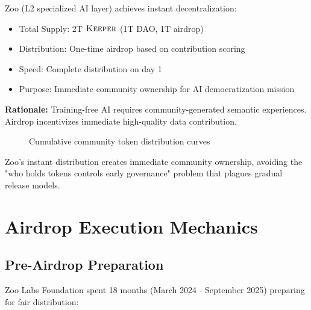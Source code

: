 \documentclass[11pt,letterpaper]{article}
\theoremstyle{definition}
\theoremstyle{remark}
\newcommand{\KEEPER}{\textsc{Keeper}}
\begin{document}
Zoo (L2 specialized AI layer) achieves instant decentralization:
\begin{itemize}
\item Total Supply: 2T $\KEEPER$ (1T DAO, 1T airdrop)
\item Distribution: One-time airdrop based on contribution scoring
\item Speed: Complete distribution on day 1
\item Purpose: Immediate community ownership for AI democratization mission
\end{itemize}

\textbf{Rationale:} Training-free AI requires community-generated semantic experiences. Airdrop incentivizes immediate high-quality data contribution.

\begin{figure}[h]
\centering
{}
\caption{Cumulative community token distribution curves}
\label{fig:distribution_curves}
\end{figure}

Zoo's instant distribution creates immediate community ownership, avoiding the "who holds tokens controls early governance" problem that plagues gradual release models.

\section{Airdrop Execution Mechanics}

\subsection{Pre-Airdrop Preparation}

Zoo Labs Foundation spent 18 months (March 2024 - September 2025) preparing for fair distribution:
\end{document}
